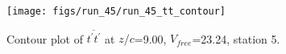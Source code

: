\begin{figure}[H]
\centering
\texttt{[image: figs/run\_45/run\_45\_tt\_contour]}
\caption{Contour plot of $\overline{t^\prime t^\prime}$ at $z/c$=9.00, $V_{free}$=23.24, station 5.}
\label{fig:run_45_tt_contour}
\end{figure}


